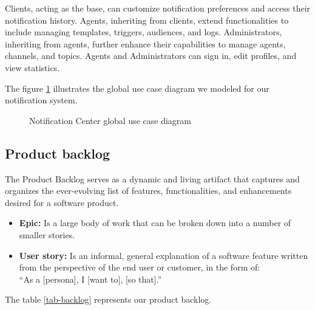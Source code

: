 Clients, acting as the base, can customize notification preferences and access their notification history.
Agents, inheriting from clients, extend functionalities to include managing templates, triggers, audiences,
and logs. Administrators, inheriting from agents, further enhance their capabilities to manage agents,
channels, and topics. Agents and Administrators can sign in, edit profiles, and view statistics.

\noindent The figure \ref{g-usecase} illustrates the global use case diagram we modeled for our notification system.

\begin{figure}[hbt!]
      \centering
      
      \caption{Notification Center global use case diagram}
      \label{g-usecase}
\end{figure}

\newpage

\subsection{Product backlog}
The Product Backlog serves as a dynamic and living artifact that captures and organizes the
ever-evolving list of features, functionalities, and enhancements desired for a software product.

\begin{itemize}
      \item \textbf{Epic:} Is a large body of work that can be broken down into a number of smaller stories.
      \item \textbf{User story:} Is an informal, general explanation of a software feature written from the
            perspective of the end user or customer, in the form of: \\ “As a [persona], I [want to], [so that].” \\
\end{itemize}

\noindent The table \ref{tab-backlog} represents our product backlog.

